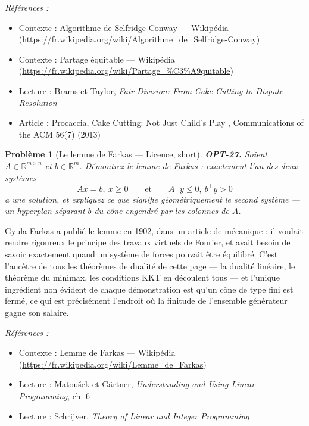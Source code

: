 \documentclass[11pt]{article}
\newtheorem{problem}{Problème}
\newenvironment{refs}{\par\small\noindent\emph{Références :}\begin{itemize}\setlength\itemsep{0pt}}{\end{itemize}\normalsize}
\begin{document}
\begin{refs}
\item Contexte : Algorithme de Selfridge-Conway --- Wikipédia (\url{https://fr.wikipedia.org/wiki/Algorithme_de_Selfridge-Conway})
\item Contexte : Partage équitable --- Wikipédia (\url{https://fr.wikipedia.org/wiki/Partage_%C3%A9quitable})
\item Lecture : Brams et Taylor, \textit{Fair Division: From Cake-Cutting to Dispute Resolution}
\item Article : Procaccia, \og{} Cake Cutting: Not Just Child's Play \fg{}, Communications of the ACM 56(7) (2013)
\end{refs}

\bigskip

\begin{problem}[{Le lemme de Farkas --- Licence, short}]
\textbf{OPT-27.} Soient $A \in \mathbb{R}^{m \times n}$ et
$b \in \mathbb{R}^m$. Démontrez le lemme de Farkas : exactement l'un des deux systèmes
\[ Ax = b,\ x \ge 0 \qquad\text{et}\qquad A^{\top} y \le 0,\ b^{\top} y >0 \]
a une solution, et expliquez ce que signifie géométriquement le second système --- un hyperplan séparant
$b$ du cône engendré par les colonnes de $A$.
\end{problem}

\noindent Gyula Farkas a publié le lemme en 1902, dans un article de mécanique : il
voulait rendre rigoureux le principe des travaux virtuels de Fourier, et avait besoin de savoir
exactement quand un système de forces pouvait être équilibré. C'est l'ancêtre de tous les théorèmes
de dualité de cette page --- la dualité linéaire, le théorème du minimax, les conditions KKT en
découlent tous --- et l'unique ingrédient non évident de chaque démonstration est qu'un cône de type
fini est fermé, ce qui est précisément l'endroit où la finitude de l'ensemble générateur gagne son
salaire.

\begin{refs}
\item Contexte : Lemme de Farkas --- Wikipédia (\url{https://fr.wikipedia.org/wiki/Lemme_de_Farkas})
\item Lecture : Matou\v{s}ek et Gärtner, \textit{Understanding and Using Linear Programming}, ch. 6
\item Lecture : Schrijver, \textit{Theory of Linear and Integer Programming}
\end{refs}

\bigskip
\end{document}
